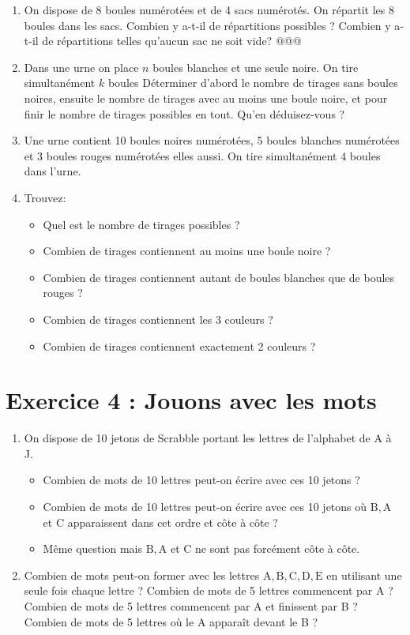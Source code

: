 \begin{enumerate}
    \item On dispose de 8 boules numérotées et de 4 sacs numérotés. On répartit les 8 boules dans les sacs. Combien y a-t-il de répartitions possibles ? Combien y a-t-il de répartitions telles qu'aucun sac ne soit vide? @@@
    \item Dans une urne on place \(n\) boules blanches et une seule noire. On tire simultanément \(k\) boules Déterminer d'abord le nombre de tirages sans boules noires, ensuite le nombre de tirages avec au moins une boule noire, et pour finir le nombre de tirages possibles en tout. Qu'en déduisez-vous ?
    \item Une urne contient 10 boules noires numérotées, 5 boules blanches numérotées et 3 boules rouges numérotées elles aussi. On tire simultanément 4 boules dans l'urne.
    \item Trouvez:
    \begin{itemize}
    \item Quel est le nombre de tirages possibles ?
    \item Combien de tirages contiennent au moins une boule noire ?
    \item Combien de tirages contiennent autant de boules blanches que de boules rouges ?
    \item Combien de tirages contiennent les 3 couleurs ?
    \item Combien de tirages contiennent exactement 2 couleurs ?
    \end{itemize}
\end{enumerate}


\section*{Exercice 4 : Jouons avec les mots}

\begin{enumerate}
    \item On dispose de 10 jetons de Scrabble portant les lettres de l'alphabet de A à J.
    \begin{itemize}
    \item Combien de mots de 10 lettres peut-on écrire avec ces 10 jetons ?
    \item Combien de mots de 10 lettres peut-on écrire avec ces 10 jetons où \(\mathrm{B}, \mathrm{A}\) et C apparaissent dans cet ordre et côte à côte ?
    \item Même question mais \(\mathrm{B}, \mathrm{A}\) et C ne sont pas forcément côte à côte.
    \end{itemize}
    \item Combien de mots peut-on former avec les lettres \(\mathrm{A}, \mathrm{B}, \mathrm{C}, \mathrm{D}, \mathrm{E}\) en utilisant une seule fois chaque lettre ? Combien de mots de 5 lettres commencent par A ? Combien de mots de 5 lettres commencent par A et finissent par B ? Combien de mots de 5 lettres où le A apparaît devant le B ?
\end{enumerate}

